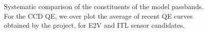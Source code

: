 \documentclass[\docopts]{\docclass}
\begin{document}
\begin{figure}[t]
\begin{center}
\caption{Systematic comparison of the constituents of the model
  passbands. For the CCD QE, we over plot the average of recent QE
  curves obtained by the project, for E2V and ITL sensor candidates. }
\label{fig:passband_constituents}
\end{center}
\end{figure}
\end{document}
